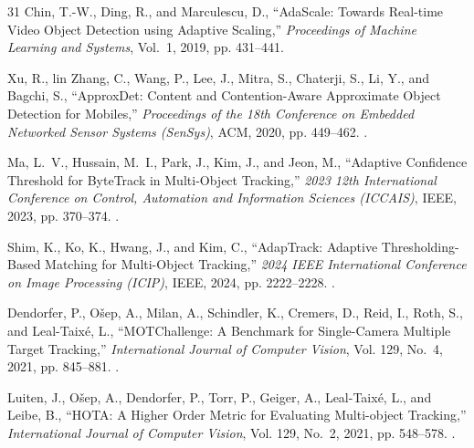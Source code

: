 \documentclass[journal]{new-aiaa}
\begin{document}
\begin{thebibliography}{31}
Chin, T.-W., Ding, R., and Marculescu, D., \enquote{{AdaScale: Towards
  Real-time Video Object Detection using Adaptive Scaling},} \emph{Proceedings
  of Machine Learning and Systems}, Vol.~1, 2019, pp. 431--441.

Xu, R., lin Zhang, C., Wang, P., Lee, J., Mitra, S., Chaterji, S., Li, Y., and
  Bagchi, S., \enquote{{ApproxDet: Content and Contention-Aware Approximate
  Object Detection for Mobiles},} \emph{Proceedings of the 18th Conference on
  Embedded Networked Sensor Systems (SenSys)}, ACM, 2020, pp. 449--462.
\newblock {}.

Ma, L.~V., Hussain, M.~I., Park, J., Kim, J., and Jeon, M., \enquote{{Adaptive
  Confidence Threshold for ByteTrack in Multi-Object Tracking},} \emph{2023
  12th International Conference on Control, Automation and Information Sciences
  (ICCAIS)}, IEEE, 2023, pp. 370--374.
\newblock {}.

Shim, K., Ko, K., Hwang, J., and Kim, C., \enquote{{AdapTrack: Adaptive
  Thresholding-Based Matching for Multi-Object Tracking},} \emph{2024 IEEE
  International Conference on Image Processing (ICIP)}, IEEE, 2024, pp.
  2222--2228.
\newblock {}.

Dendorfer, P., O{\v{s}}ep, A., Milan, A., Schindler, K., Cremers, D., Reid, I.,
  Roth, S., and Leal-Taix{\'e}, L., \enquote{{MOTChallenge: A Benchmark for
  Single-Camera Multiple Target Tracking},} \emph{International Journal of
  Computer Vision}, Vol. 129, No.~4, 2021, pp. 845--881.
\newblock {}.

Luiten, J., O\v{s}ep, A., Dendorfer, P., Torr, P., Geiger, A., Leal-Taix\'{e},
  L., and Leibe, B., \enquote{{HOTA: A Higher Order Metric for Evaluating
  Multi-object Tracking},} \emph{International Journal of Computer Vision},
  Vol. 129, No.~2, 2021, pp. 548--578.
\newblock {}.


\end{thebibliography}
\end{document}
